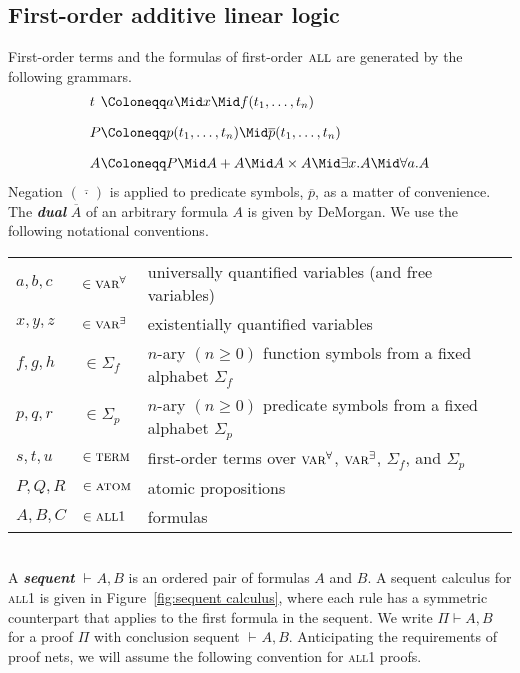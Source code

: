 \documentclass{article}
\theoremstyle{definition}
\theoremstyle{plain}
\newcommand\defn[1]{\textit{\textbf{#1}}}
\newcommand\varA{\textsc{var}^\forall}
\newcommand\varE{\textsc{var}^\exists}
\newcommand\terms{\textsc{term}}
\newcommand\atom{\textsc{atom}}
\newcommand\all{\textsc{all}}
\newcommand\+{+}
\renewcommand\*{\times}
\newcommand\dual[1]{\overline{#1}}
\newcommand\seq[3][]{{\vdash_{#1}}#2,#3}
\newcommand\prf[3]{#1\vdash\!#2,#3}
\begin{document}


\subsection{First-order additive linear logic}

First-order terms and the formulas of first-order $\all$ are generated by the following grammars.
%
\setMidspace{5pt}
\[
\begin{array}{l@{}l}
	t &\Coloneqq a \Mid x \Mid f(t_1,\dots,t_n)
\\[10pt]
	P &\Coloneqq p(t_1,\dots,t_n) \Mid \dual p(t_1,\dots,t_n)
\\[10pt]
	A &\Coloneqq P \Mid A\+A \Mid A\*A \Mid \exists x.A \Mid \forall a.A
\end{array}
\]
%
Negation $(\dual{\,\cdot\,})$ is applied to predicate symbols, $\dual p$, as a matter of convenience. The \defn{dual} $\dual A$ of an arbitrary formula $A$ is given by DeMorgan. We use the following notational conventions.
%
\\[2\itemsep]
%
\begin{tabular}{@{}lll@{}}
	$a,b,c$ & $\in \varA$ 		& universally quantified variables (and free variables)\\
	$x,y,z$ & $\in \varE$		& existentially quantified variables \\
	$f,g,h$ & $\in \Sigma_f$	& $n$-ary $(n\geq 0)$ function symbols from a fixed alphabet $\Sigma_f$\\
	$p,q,r$ & $\in \Sigma_p$	& $n$-ary $(n\geq 0)$ predicate symbols from a fixed alphabet $\Sigma_p$ \\
	$s,t,u$ & $\in \terms$ 		& first-order terms over $\varA$, $\varE$, $\Sigma_f$, and $\Sigma_p$ \\
	$P,Q,R$ & $\in \atom$		& atomic propositions \\
	$A,B,C$ & $\in \all1$		& formulas \\
\end{tabular}
%
\\[2\itemsep]
%
A \defn{sequent} $\seq AB$ is an ordered pair of formulas $A$ and $B$. A sequent calculus for \all1 is given in Figure~\ref{fig:sequent calculus}, where each rule has a symmetric counterpart that applies to the first formula in the sequent. We write $\prf\Pi AB$ for a proof $\Pi$ with conclusion sequent $\seq AB$. Anticipating the requirements of proof nets, we will assume the following convention for \all1 proofs.
\end{document}
